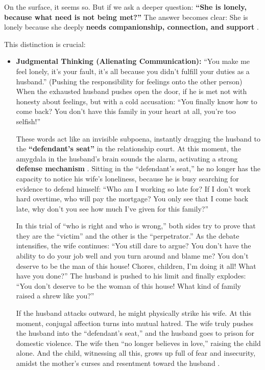 On the surface, it seems so.
But if we ask a deeper question: \textbf{``She is lonely, because what need
is not being met?''}
The answer becomes clear: She is lonely because she deeply \textbf{needs
companionship, connection, and support} \citep{bowlby1969}.

This distinction is crucial:
\begin{itemize}
    \item \textbf{Judgmental Thinking (Alienating Communication):}
    ``You make me feel lonely, it's your fault, it's all because you didn't
    fulfill your duties as a husband.''
    (Pushing the responsibility for feelings onto the other person)
    When the exhausted husband pushes open the door, if he is met not with
    honesty about feelings, but with a cold accusation: ``You finally know
    how to come back? You don't have this family in your heart at all,
    you're too selfish!''

    These words act like an invisible subpoena, instantly dragging the
    husband to the \textbf{``defendant's seat''} in the relationship court.
    At this moment, the amygdala in the husband's brain sounds the alarm,
    activating a strong \textbf{defense mechanism} \citep{lieberman2007}.
    Sitting in the ``defendant's seat,'' he no longer has the capacity to
    notice his wife's loneliness, because he is busy searching for evidence
    to defend himself:
    ``Who am I working so late for? If I don't work hard overtime, who will
    pay the mortgage? You only see that I come back late, why don't you see
    how much I've given for this family?''

    In this trial of ``who is right and who is wrong,'' both sides try to
    prove that they are the ``victim'' and the other is the ``perpetrator.''
    As the debate intensifies, the wife continues: ``You still dare to
    argue? You don't have the ability to do your job well and you turn
    around and blame me? You don't deserve to be the man of this house!
    Chores, children, I'm doing it all! What have you done?''
    The husband is pushed to his limit and finally explodes: ``You don't
    deserve to be the woman of this house! What kind of family raised a
    shrew like you?''

    If the husband attacks outward, he might physically strike his wife.
    At this moment, conjugal affection turns into mutual hatred.
    The wife truly pushes the husband into the ``defendant's seat,'' and
    the husband goes to prison for domestic violence.
    The wife then ``no longer believes in love,'' raising the child alone.
    And the child, witnessing all this, grows up full of fear and insecurity,
    amidst the mother's curses and resentment toward the husband \citep{vanderkolk2014}.


\end{itemize}
